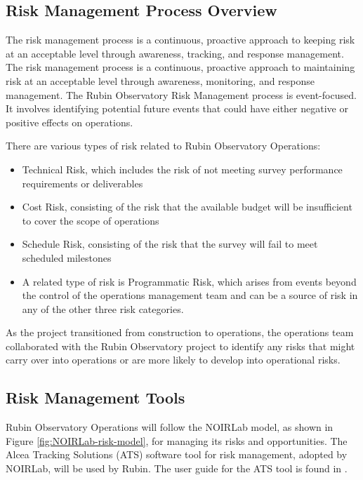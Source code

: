 \subsection{Risk Management Process Overview}

The risk management process is a continuous, proactive approach to keeping risk at an acceptable level through awareness, tracking, and response management.
The risk management process is a continuous, proactive approach to maintaining risk at an acceptable level through awareness, monitoring, and response management. 
The Rubin Observatory Risk Management process is event-focused. 
It involves identifying potential future events that could have either negative or positive effects on operations.

There are various types of risk related to Rubin Observatory Operations:
\begin{itemize}
	\item Technical Risk, which includes the risk of not meeting survey performance requirements or deliverables
	\item Cost Risk, consisting of the risk that the available budget will be insufficient to cover the scope of operations
	\item Schedule Risk, consisting of the risk that the survey will fail to meet scheduled milestones
	\item A related type of risk is Programmatic Risk, which arises from events beyond the control of the operations management team and can be a source of risk in any of the other three risk categories. 

\end{itemize}

As the project transitioned from construction to operations, the operations team collaborated with the Rubin Observatory project to identify any risks that might carry over into operations or are more likely to develop into operational risks.

\subsection{Risk Management Tools}

Rubin Observatory Operations will follow the NOIRLab model, as shown in Figure \ref{fig:NOIRLab-risk-model}, for managing its risks and opportunities. 
The Alcea Tracking Solutions (ATS) software tool \citep{ATS-cite} for risk management, adopted by NOIRLab, will be used by Rubin.
The user guide for the ATS tool is found in .

